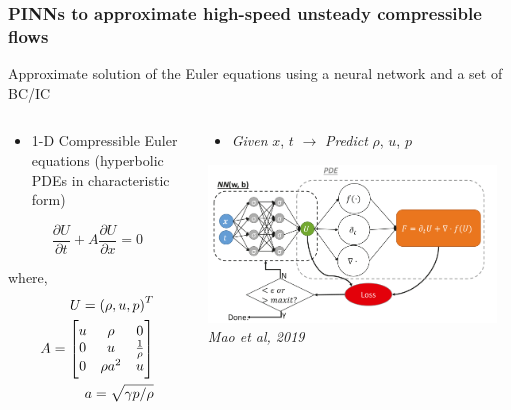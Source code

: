 \documentclass[aspectratio=169]{beamer}
\begin{document}
\begin{frame}\frametitle{PINNs to approximate high-speed unsteady compressible flows}

Approximate solution of the Euler equations using a neural network and a set of BC/IC
	
	\begin{columns}
		\begin{column}{0.45\textwidth}
			
			\begin{itemize}
				\item 1-D Compressible Euler equations (hyperbolic PDEs in characteristic form)
			\end{itemize}
								 
			\begin{equation*}
				\frac{\partial U}{\partial t} + A \frac{\partial U}{\partial x} = 0
			\end{equation*}
			
			where,			
			\begin{align*}
				U = \left ( \rho, u, p \right)^T \\
				\vspace{10pt}
				A = \begin{bmatrix}
					u & \rho & 0 \\
					0 & u & \frac{1}{\rho} \\
					0 & \rho a^2 & u
				\end{bmatrix} \\
				a = \sqrt{\gamma p / \rho}
			\end{align*}			
		\end{column}
		
		\begin{column}{0.5\textwidth}
		
			\begin{itemize}
				\item \textit{Given} $x$, $t$ $\rightarrow$ \textit{Predict} $\rho$, $u$, $p$
			\end{itemize}
			
			\begin{center}
				\includegraphics[width=0.95\textwidth]{Figures/neural_network_architecture.png}
				\tiny \textit{Mao et al, 2019}
			\end{center}
			

\end{column}
\end{columns}
\end{frame}
\end{document}
